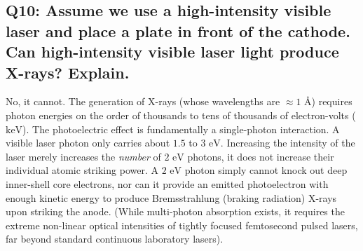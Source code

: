 \documentclass[a4paper,11pt]{article}
\begin{document}
\subsection*{Q10: Assume we use a high-intensity visible laser and place a plate in front of the cathode. Can high-intensity visible laser light produce X-rays? Explain.}
No, it cannot. The generation of X-rays (whose wavelengths are $\approx 1\text{ \AA}$) requires photon energies on the order of thousands to tens of thousands of electron-volts ($\text{keV}$). The photoelectric effect is fundamentally a single-photon interaction. A visible laser photon only carries about $1.5$ to $3\text{ eV}$. Increasing the intensity of the laser merely increases the \textit{number} of $2\text{ eV}$ photons, it does not increase their individual atomic striking power. A $2\text{ eV}$ photon simply cannot knock out deep inner-shell core electrons, nor can it provide an emitted photoelectron with enough kinetic energy to produce Bremsstrahlung (braking radiation) X-rays upon striking the anode. (While multi-photon absorption exists, it requires the extreme non-linear optical intensities of tightly focused femtosecond pulsed lasers, far beyond standard continuous laboratory lasers).
\end{document}
